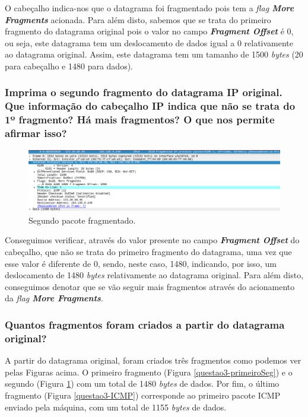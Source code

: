     \par O cabeçalho indica-nos que o datagrama foi fragmentado pois tem a \textit{flag \textbf{More Fragments}} acionada. Para além disto, sabemos que se trata do primeiro fragmento do datagrama original pois o valor no campo \textit{\textbf{Fragment Offset}} é 0, ou seja, este datagrama tem um deslocamento de dados igual a 0 relativamente ao datagrama original. Assim, este datagrama tem um tamanho de 1500 \textit{bytes} (20 para cabeçalho e 1480 para dados).
    
    
\subsubsection{Imprima o segundo fragmento do datagrama IP original. Que informação do cabeçalho IP indica que não se trata do 1º fragmento? Há mais fragmentos? O que nos permite afirmar isso?}

    \begin{figure}[H]
    \centering
    \includegraphics[width=500pt]{images/ParteI/Questao3/questao3-secondSegment.png}
    \caption{Segundo pacote fragmentado.} \label{questao3-segundoSeg}
    \end{figure}
    
    \par Conseguimos verificar, através do valor presente no campo \textit{\textbf{Fragment Offset}} do cabeçalho, que não se trata do primeiro fragmento do datagrama, uma vez que esse valor é diferente de 0, sendo, neste caso, 1480, indicando, por isso, um deslocamento de 1480 \textit{bytes} relativamente ao datagrama original. Para além disto, conseguimos denotar que se vão seguir mais fragmentos através do acionamento da \textit{flag \textbf{More Fragments}}.
    
\subsubsection{Quantos fragmentos foram criados a partir do datagrama original?}

    \par A partir do datagrama original, foram criados três fragmentos como podemos ver pelas Figuras acima. O primeiro fragmento (Figura \ref{questao3-primeiroSeg}) e o segundo (Figura \ref{questao3-segundoSeg}) com um total de 1480 \textit{bytes} de dados. Por fim, o último fragmento (Figura \ref{questao3-ICMP}) corresponde ao primeiro pacote ICMP enviado pela máquina, com um total de 1155 \textit{bytes} de dados.
    
